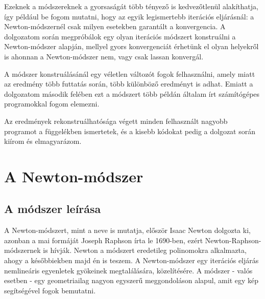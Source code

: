 \documentclass[a4paper,12pt]{report}
\begin{document}
		Ezeknek a módszereknek a gyorsaságát több tényező is kedvezőtlenül alakíthatja, így például be fogom mutatni, hogy az egyik legismertebb iterációs eljárásnál: a Newton-módszernél csak milyen esetekben garantált a konvergencia.  A dolgozatom során megpróbálok egy olyan iterációs módszert konstruálni a Newton-módszer alapján, mellyel gyors konvergenciát érhetünk el olyan helyekről is ahonnan a Newton-módszer nem, vagy csak lassan konvergál.

		A módszer konstruálásánál egy véletlen változót fogok felhasználni, amely miatt az eredmény több futtatás során, több különböző eredményt is adhat. Emiatt a dolgozatom második felében ezt a módszert több példán általam írt számítógépes programokkal fogom elemezni.

		Az eredmények rekonstruálhatósága végett minden felhasznált nagyobb programot a függelékben ismertetek, és a kisebb kódokat pedig a dolgozat során kiírom és elmagyarázom.












%
%


	\chapter{A Newton-módszer}
    

        
        
        
        
        
        
        
        
        
        
        
		\section{A módszer leírása}
			A Newton-módszert, mint a neve is mutatja, először Isaac Newton dolgozta ki, azonban a mai formáját Joseph Raphson írta le 1690-ben, ezért Newton-Raphson-módszernek is hívják. Newton a módszert eredetileg polinomokra alkalmazta, ahogy a későbbiekben majd én is teszem. A Newton-módszer egy iterációs eljárás nemlineáris egyenletek gyökeinek megtalálására, közelítésére. A módszer - valós esetben - egy geometriailag nagyon egyszerű meggondoláson alapul, amit egy kép segítségével fogok bemutatni.
			
\end{document}
